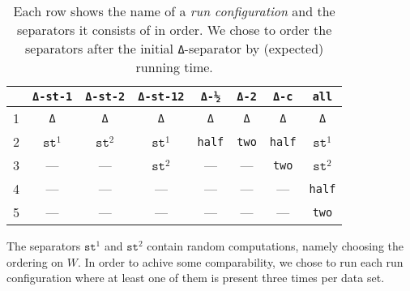 \begin{table}
\centering
\begin{tabular}{lccccccc}
\toprule
  & \texttt{Δ-st-1} & \texttt{Δ-st-2} & \texttt{Δ-st-12}	& \texttt{Δ-½}	& \texttt{Δ-2} 	& \texttt{Δ-c}	& \texttt{all}  	\\
\midrule
1 & \texttt{Δ}      & \texttt{Δ}      & \texttt{Δ}      	& \texttt{Δ}	& \texttt{Δ}	& \texttt{Δ}	& \texttt{Δ} 		\\
2 & $\texttt{st}^1$ & $\texttt{st}^2$ & $\texttt{st}^1$ 	& \texttt{half}	& \texttt{two} 	& \texttt{half}	& $\texttt{st}^1$  	\\
3 & —               & —               & $\texttt{st}^2$ 	& —    			& —   		   	& \texttt{two}  & $\texttt{st}^2$  	\\
4 & —               & —               & —               	& —    			& —   		   	& —      		& \texttt{half}     \\
5 & —               & —               & —               	& —    			& — 			& —      		& \texttt{two}      \\
\bottomrule
\end{tabular}
\caption{Each row shows the name of a \textit{run configuration} and the separators it consists of in order.
We chose to order the separators after the initial \texttt{Δ}-separator by (expected) running time.}
\label{tab:run_configurations}
\end{table}

The separators $\texttt{st}^{1}$ and $\texttt{st}^{2}$ contain random computations, namely choosing the ordering on $W$.
In order to achive some comparability, we chose to run each run configuration where at least one of them is present three times per data set.
